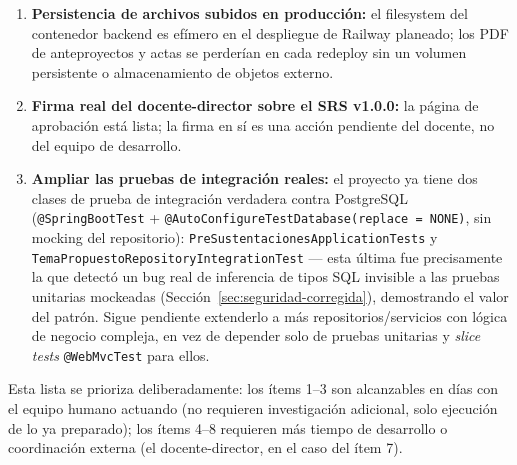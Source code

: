 \begin{enumerate}[nosep]
    es una búsqueda dirigida, no una SLR completa con protocolo pre-registrado y doble revisor
    independiente, siguiendo Kitchenham y Charters \cite{kitchenham2007}.
    \item \textbf{Persistencia de archivos subidos en producción:} el filesystem del contenedor backend
    es efímero en el despliegue de Railway planeado; los PDF de anteproyectos y actas se perderían en
    cada redeploy sin un volumen persistente o almacenamiento de objetos externo.
    \item \textbf{Firma real del docente-director sobre el SRS v1.0.0:} la página de aprobación está
    lista; la firma en sí es una acción pendiente del docente, no del equipo de desarrollo.
    \item \textbf{Ampliar las pruebas de integración reales:} el proyecto ya tiene dos clases de prueba
    de integración verdadera contra PostgreSQL (\texttt{@SpringBootTest} +
    \texttt{@AutoConfigureTestDatabase(replace = NONE)}, sin mocking del repositorio):
    \texttt{PreSustentacionesApplicationTests} y \texttt{TemaPropuestoRepositoryIntegrationTest} --- esta
    última fue precisamente la que detectó un bug real de inferencia de tipos SQL invisible a las
    pruebas unitarias mockeadas (Sección~\ref{sec:seguridad-corregida}), demostrando el valor del
    patrón. Sigue pendiente extenderlo a más repositorios/servicios con lógica de negocio compleja, en
    vez de depender solo de pruebas unitarias y \textit{slice tests} \texttt{@WebMvcTest} para ellos.
\end{enumerate}

Esta lista se prioriza deliberadamente: los ítems 1--3 son alcanzables en días con el equipo humano
actuando (no requieren investigación adicional, solo ejecución de lo ya preparado); los ítems 4--8
requieren más tiempo de desarrollo o coordinación externa (el docente-director, en el caso del ítem 7).
\newpage
